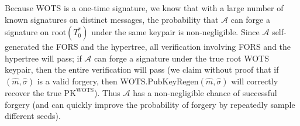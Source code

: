 \documentclass{article}
\begin{document}
Because WOTS is a one-time signature, we know that with a large number of known signatures on distinct messages, the probability that $\mathcal{A}$ can forge a signature on $\text{root}(T_0^\ast)$ under the same keypair is non-negligible. Since $\mathcal{A}$ self-generated the FORS and the hypertree, all verification involving FORS and the hypertree will pass; if $\mathcal{A}$ can forge a signature under the true root WOTS keypair, then the entire verification will pass (we claim without proof that if $(\hat{m}, \hat{\sigma})$ is a valid forgery, then $\text{WOTS.PubKeyRegen}(\hat{m}, \hat{\sigma})$ will correctly recover the true $\text{PK}^\text{WOTS}$). Thus $\mathcal{A}$ has a non-negligible chance of successful forgery (and can quickly improve the probability of forgery by repeatedly sample different seeds).
\end{document}
